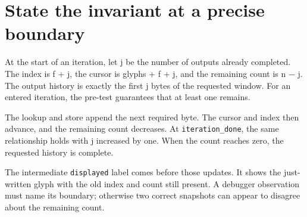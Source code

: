 \section{State the invariant at a precise
  boundary}\label{005-seven-segment-counter-p07-state-the-invariant-at-a-precise-boundary}

At the start of an iteration, let j be the number of outputs already
completed. The index is f + j, the cursor is glyphs + f + j, and the
remaining count is n \ensuremath{-} j. The output history is exactly the first j
bytes of the requested window. For an entered iteration, the pre-test
guarantees that at least one remains.

The lookup and store append the next required byte. The cursor and index
then advance, and the remaining count decreases. At
\texttt{iteration\_done}, the same relationship holds with j increased
by one. When the count reaches zero, the requested history is complete.

The intermediate \texttt{displayed} label comes before those updates. It
shows the just-written glyph with the old index and count still present.
A debugger observation must name its boundary; otherwise two correct
snapshots can appear to disagree about the remaining count.
